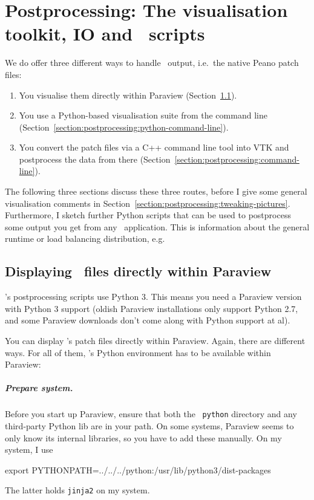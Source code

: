 \chapter{Postprocessing: The visualisation toolkit, IO and \Peano\
scripts}
\label{chapter:postprocessing}



We do offer three different ways to handle \Peano\ output, i.e.~the native Peano
patch files:

\begin{enumerate}
  \item You visualise them directly within Paraview (Section~\ref{label:postprocessing:display-in-paraview}).
  \item You use a Python-based visualisation suite from the command line
  (Section~\ref{section:postprocessing:python-command-line}).
  \item You convert the patch files via a C++ command line tool into VTK and
  postprocess the data from there
  (Section~\ref{section:postprocessing:command-line}).
\end{enumerate}


\noindent
The following three sections discuss these three routes, before I give some
general visualisation comments in
Section~\ref{section:postprocessing:tweaking-pictures}. 
Furthermore, I sketch further Python scripts that can be used to postprocess
some output you get from any \Peano\ application.
This is information about the general runtime or load balancing distribution,
e.g.


\section{Displaying \Peano\ files directly within Paraview}
\label{label:postprocessing:display-in-paraview}

\begin{remark}
  \Peano's postprocessing scripts use Python 3. This means you need a Paraview
  version with Python 3 support (oldish Paraview installations only support
  Python 2.7, and some Paraview downloads don't come along with Python support
  at al).
\end{remark}


\noindent
You can display \Peano's patch files directly within Paraview. 
Again, there are different ways.
For all of them, \Peano's Python environment has to be available within Paraview:



\paragraph{Prepare system.}
%
%
Before you start up Paraview, ensure that both the \Peano\ \texttt{python}
directory and any third-party Python lib are in your path. 
On some systems, Paraview seems to
only know its internal libraries, so you have to add these manually. On my
system, I use
  \begin{code}
export PYTHONPATH=../../../python:/usr/lib/python3/dist-packages  
  \end{code}
The latter holds \texttt{jinja2} on my system.


